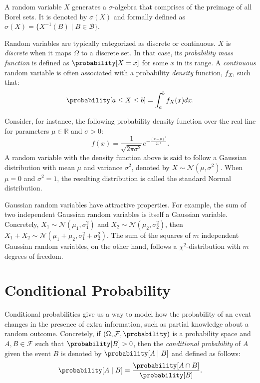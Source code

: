 A random variable $X$ generates a $\sigma$-algebra that comprises of the preimage
of all Borel sets. It is denoted by $\sigma(X)$
and formally defined as $\sigma(X) = \{ X^{-1}(B) \;|\; B \in \mathcal{B} \}$.

\bigskip

Random variables are typically categorized as discrete or continuous.
$X$ is \emph{discrete} when it maps $\Omega$ to a discrete set.
In that case, its \emph{probability mass function} is defined as $\probability[X = x]$
for some $x$ in its range.
A \emph{continuous} random variable is often associated with a
probability \emph{density} function, $f_X$, such that:
\begin{equation*}
    \probability[a \leq X \leq b] = \int_a^b f_X(x) dx.
\end{equation*}

Consider, for instance, the following probability density function over the real line for
parameters $\mu \in \mathbb{R}$ and $\sigma > 0$:
\begin{equation*}
    f(x) = \frac{1}{\sqrt{2 \pi \sigma^2}} e^{- \frac{(x - \mu)^2}{2\sigma^2}}.
\end{equation*}
A random variable with the density function above is said to follow a Gaussian
distribution with mean $\mu$ and variance $\sigma^2$, denoted by $X \sim \mathcal{N}(\mu, \sigma^2)$.
When $\mu = 0$ and $\sigma^2 = 1$, the resulting distribution is called the standard
Normal distribution.

Gaussian random variables have attractive properties.
For example, the sum of two independent Gaussian random variables is itself a Gaussian variable.
Concretely, $X_1 \sim \mathcal{N}(\mu_1, \sigma_1^2)$ and $X_2 \sim \mathcal{N}(\mu_2, \sigma_2^2)$,
then $X_1 + X_2 \sim \mathcal{N}(\mu_1 + \mu_2, \sigma_1^2 + \sigma_2^2)$.
The sum of the squares of $m$ independent Gaussian random variables, on the other hand,
follows a $\chi^2$-distribution with $m$ degrees of freedom.

\section{Conditional Probability}
Conditional probabilities give us a way to model how the probability of an event changes
in the presence of extra information, such as partial knowledge about a random outcome.
Concretely, if $(\Omega, \mathcal{F}, \probability)$ is a probability space and
$A, B \in \mathcal{F}$ such that $\probability[B] > 0$, then the \emph{conditional
probability} of $A$ given the event $B$ is denoted by $\probability[A \;\lvert\; B]$ and
defined as follows:
\begin{equation*}
    \probability[A \;\lvert\; B] = \frac{\probability[A \cap B]}{\probability[B]}.
\end{equation*}

